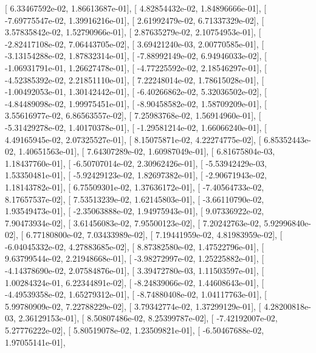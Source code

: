 \documentclass{article}
\begin{document}
       [  6.33467592e-02,   1.86613687e-01],
       [  4.82854432e-02,   1.84896666e-01],
       [ -7.69775547e-02,   1.39916216e-01],
       [  2.61992479e-02,   6.71337329e-02],
       [  3.57835842e-02,   1.52790966e-01],
       [  2.87635279e-02,   2.10754953e-01],
       [ -2.82417108e-02,   7.06443705e-02],
       [  3.69421240e-03,   2.00770585e-01],
       [ -3.13154288e-02,   1.87832314e-01],
       [ -7.88992149e-02,   6.94946033e-02],
       [ -1.06931791e-01,   1.26627478e-01],
       [ -4.77225592e-02,   2.18546297e-01],
       [ -4.52385392e-02,   2.21851110e-01],
       [  7.22248014e-02,   1.78615028e-01],
       [ -1.00492053e-01,   1.30142442e-01],
       [ -6.40266862e-02,   5.32036502e-02],
       [ -4.84489098e-02,   1.99975451e-01],
       [ -8.90458582e-02,   1.58709209e-01],
       [  3.55616977e-02,   6.86563557e-02],
       [  7.25983768e-02,   1.56914960e-01],
       [ -5.31429278e-02,   1.40170378e-01],
       [ -1.29581214e-02,   1.66066240e-01],
       [  4.49165945e-02,   2.07325527e-01],
       [  8.15075871e-02,   4.22274775e-02],
       [  6.85352443e-02,   1.40651563e-01],
       [  7.64307289e-02,   1.60987049e-01],
       [  6.81675804e-03,   1.18437760e-01],
       [ -6.50707014e-02,   2.30962426e-01],
       [ -5.53942429e-03,   1.53350481e-01],
       [ -5.92429123e-02,   1.82697382e-01],
       [ -2.90671943e-02,   1.18143782e-01],
       [  6.75509301e-02,   1.37636172e-01],
       [ -7.40564733e-02,   8.17657537e-02],
       [  7.53513239e-02,   1.62145803e-01],
       [ -3.66110790e-02,   1.93549473e-01],
       [ -2.35063888e-02,   1.94975943e-01],
       [  9.07336922e-02,   7.90473934e-02],
       [  3.61456083e-02,   7.95500123e-02],
       [  7.20242763e-02,   5.92996840e-02],
       [  6.77180800e-02,   7.03433989e-02],
       [  7.19441959e-02,   4.81983959e-02],
       [ -6.04045332e-02,   4.27883685e-02],
       [  8.87382580e-02,   1.47522796e-01],
       [  9.63799544e-02,   2.21948668e-01],
       [ -3.98272997e-02,   1.25225882e-01],
       [ -4.14378690e-02,   2.07584876e-01],
       [  3.39472780e-03,   1.11503597e-01],
       [  1.00284324e-01,   6.22344891e-02],
       [ -8.24839066e-02,   1.44608643e-01],
       [ -4.49539358e-02,   1.65279312e-01],
       [ -8.74880408e-02,   1.04117763e-01],
       [  5.99780909e-02,   7.22788229e-02],
       [  3.79342774e-02,   1.37299129e-01],
       [  4.28200818e-03,   2.36129153e-01],
       [  8.50807486e-02,   8.25399787e-02],
       [ -7.42192007e-02,   5.27776222e-02],
       [  5.80519078e-02,   1.23509821e-01],
       [ -6.50467688e-02,   1.97055141e-01],
\end{document}
